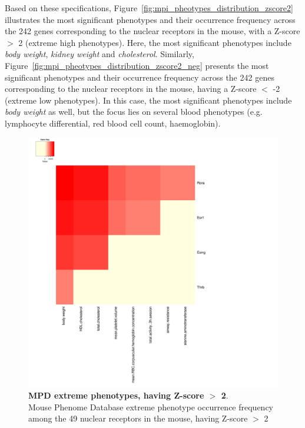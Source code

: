 \documentclass[fleqn,11pt]{SelfArx}
\begin{document}
Based on these specifications, Figure~\ref{fig:mpi_pheotypes_distribution_zscore2} illustrates the most significant phenotypes and their occurrence frequency across the 242 genes corresponding to the nuclear receptors in the mouse, with a Z-score $>$ 2 (extreme high phenotypes). Here, the most significant phenotypes include \textit{body weight}, \textit{kidney weight} and \textit{cholesterol}. Similarly, Figure~\ref{fig:mpi_pheotypes_distribution_zscore2_neg} presents the most significant phenotypes and their occurrence frequency across the 242 genes corresponding to the nuclear receptors in the mouse, having a Z-score $<$ -2 (extreme low phenotypes). In this case, the most significant phenotypes include \textit{body weight} as well, but the focus lies on several blood phenotypes (e.g. lymphocyte differential, red blood cell count, haemoglobin). 
\begin{figure}[H]
	\centering
	\includegraphics[width=\linewidth]{pics/mpi_phenotypes_nr_zscore2.pdf}
	\captionsetup{margin=12pt,format=plain,font=footnotesize,labelfont=bf}
 	\caption{\footnotesize{\textbf{MPD extreme phenotypes, having Z-score $>$ 2}. 
	~~~~~~~\\
	Mouse Phenome Database extreme phenotype occurrence frequency among the 49 nuclear receptors in the mouse, having Z-score $>$ 2}}
	\label{fig:mpi_pheotypes_strain_zscore2}
\end{figure}
\end{document}
